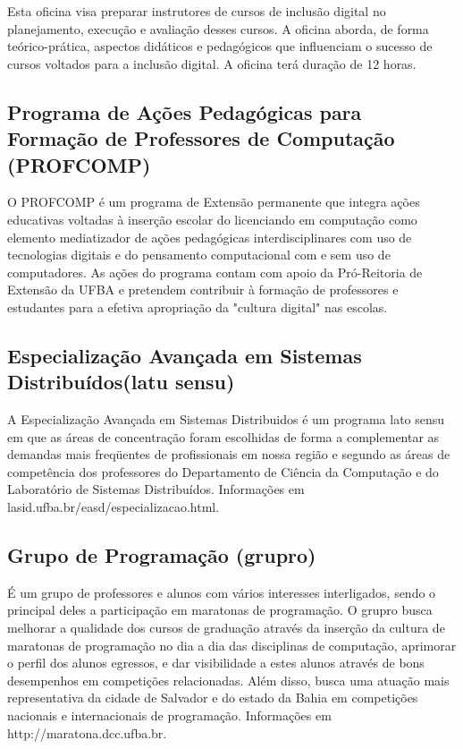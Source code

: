        Esta oficina visa preparar instrutores de cursos de inclusão digital no planejamento, execução e avaliação desses cursos. A oficina aborda, de forma teórico-prática, aspectos didáticos e pedagógicos que influenciam o sucesso de cursos voltados para a inclusão digital. A oficina terá duração de 12 horas.  
     
     \subsection{Programa de Ações Pedagógicas para Formação de Professores de Computação (PROFCOMP)}
    O PROFCOMP é um programa de Extensão permanente que integra ações educativas voltadas à inserção escolar do licenciando em computação como elemento mediatizador de ações pedagógicas interdisciplinares com uso de tecnologias digitais e do pensamento computacional com e sem uso de computadores. As ações do programa contam com apoio da Pró-Reitoria de Extensão da UFBA e pretendem contribuir à formação de professores e estudantes para a efetiva apropriação da "cultura digital" nas escolas. 
      
      \subsection{Especialização Avançada em Sistemas Distribuídos(latu sensu)}
      
      
     A Especialização Avançada em Sistemas Distribuidos é um programa lato sensu em que as áreas de concentração foram escolhidas de forma a complementar as demandas mais freqüentes de profissionais em nossa região e segundo as áreas de competência dos professores do Departamento de Ciência da Computação e do Laboratório de Sistemas Distribuídos.  Informações em lasid.ufba.br/easd/especializacao.html. 
      
      \subsection{Grupo de Programação (grupro)}
      
      É um grupo de professores e alunos com vários interesses interligados, sendo o principal deles a participação em maratonas de programação. O grupro busca melhorar a qualidade dos cursos de graduação através da inserção da cultura de maratonas de programação no dia a dia das disciplinas de computação, aprimorar o perfil dos alunos egressos, e dar visibilidade a estes alunos através de bons desempenhos em competições relacionadas. Além disso, busca uma atuação mais representativa da cidade de Salvador e do estado da Bahia em competições nacionais e internacionais de programação. Informações em http://maratona.dcc.ufba.br. 
      
